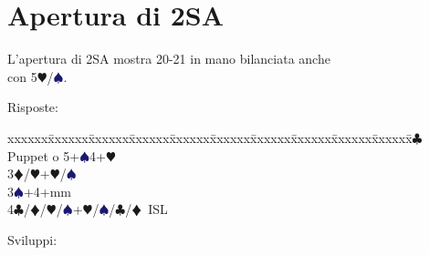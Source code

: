 \documentclass[a4paper,italian]{article}
\newcommand{\BC}{\textcolor{OliveGreen}{$\clubsuit$}}
\newcommand{\BD}{\textcolor{RedOrange}{$\vardiamondsuit$}}
\newcommand{\BH}{\textcolor{Red2}{$\varheartsuit${}}}
\newcommand{\BS}{\textcolor{MidnightBlue}{$\spadesuit${}}}
\newenvironment{bidtable}
{\begin{tabbing}

    xxxxxx\=xxxxxx\=xxxxxx\=xxxxxx\=xxxxxx\=xxxxxx\=xxxxxx\=xxxxxx\=xxxxxx\=xxxxxx\=\kill}
{\end{tabbing} }%
\begin{document}
                                    \section{Apertura di 2SA}
                                    \begin{multicols}{2}
                                        L'apertura di 2SA mostra 20-21 in mano bilanciata anche\\con 5\BH/\BS.

                                        Risposte:

                                        \begin{bidtable}
                                            3\BC\> Puppet o 5+\BS4+\BH\\
                                            3\BD/\BH{}+\BH/\BS\\
                                            3\BS{}+4+mm\\
                                            4\BC/\BD/\BH/\BS\>+\BH/\BS/\BC/\BD\ ISL\\
                                        \end{bidtable}

                                        Sviluppi:


\end{multicols}
\end{document}
